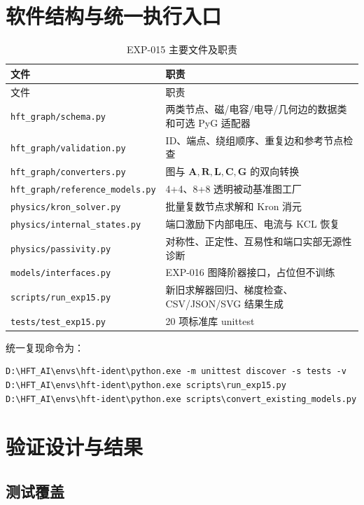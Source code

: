 \documentclass[11pt,a4paper]{ctexart}
\newcommand{\mat}[1]{\bm{#1}}
\newcommand{\code}[1]{\texttt{#1}}
\begin{document}
\section{软件结构与统一执行入口}

\footnotesize
\begin{longtable}{p{5.4cm}p{8.8cm}}
\caption{EXP-015 主要文件及职责}\\
\toprule 文件 & 职责\\\midrule\endfirsthead
\toprule 文件 & 职责\\\midrule\endhead
\code{hft\_graph/schema.py} & 两类节点、磁/电容/电导/几何边的数据类和可选 PyG 适配器\\
\code{hft\_graph/validation.py} & ID、端点、绕组顺序、重复边和参考节点检查\\
\code{hft\_graph/converters.py} & 图与 \(\mat A,\mat R,\mat L,\mat C,\mat G\) 的双向转换\\
\code{hft\_graph/reference\_models.py} & 4+4、8+8 透明被动基准图工厂\\
\code{physics/kron\_solver.py} & 批量复数节点求解和 Kron 消元\\
\code{physics/internal\_states.py} & 端口激励下内部电压、电流与 KCL 恢复\\
\code{physics/passivity.py} & 对称性、正定性、互易性和端口实部无源性诊断\\
\code{models/interfaces.py} & EXP-016 图降阶器接口，占位但不训练\\
\code{scripts/run\_exp15.py} & 新旧求解器回归、梯度检查、CSV/JSON/SVG 结果生成\\
\code{tests/test\_exp15.py} & 20 项标准库 unittest\\
\bottomrule
\end{longtable}
\normalsize

统一复现命令为：
\begin{verbatim}
D:\HFT_AI\envs\hft-ident\python.exe -m unittest discover -s tests -v
D:\HFT_AI\envs\hft-ident\python.exe scripts\run_exp15.py
D:\HFT_AI\envs\hft-ident\python.exe scripts\convert_existing_models.py
\end{verbatim}

\section{验证设计与结果}

\subsection{测试覆盖}
\end{document}
